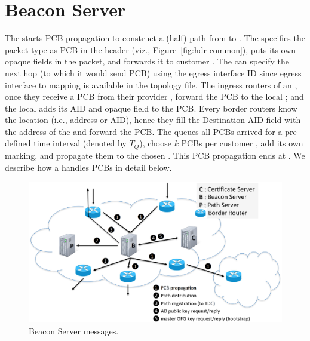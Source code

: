 \section{Beacon Server}
The \TDC \BS starts PCB propagation to construct a (half) path from \TDC to \STUB \ADs. The \BS specifies the packet type as PCB in the header (viz., Figure~\ref{fig:hdr-common}), puts its own opaque fields in the packet, and forwards it to customer \ADs. The \BS can specify the next hop \AD (to which it would send PCB) using the egress interface ID since egress interface to \AD mapping is available in the topology file. The ingress routers of an \AD, once they receive a PCB from their provider \AD, forward the PCB to the local \BS; and the local \BS adds its AID and opaque field to the PCB. Every border routers know the \BS location (i.e., address or AID), hence they fill the Destination AID field with the address of the \BS and forward the PCB. The \BS queues all PCBs arrived for a pre-defined time interval (denoted by $T_Q$), choose $k$ PCBs per customer \AD, add its own marking, and propagate them to the chosen \ADs. This PCB propagation ends at \STUB \ADs. We describe how a \BS handles PCBs in detail below.

\begin{figure}[ht]
\centering
\includegraphics[width=.9\columnwidth]{./fig/bs_message.eps}
\caption{Beacon Server messages.}\label{fig:bs-message}
\end{figure}

